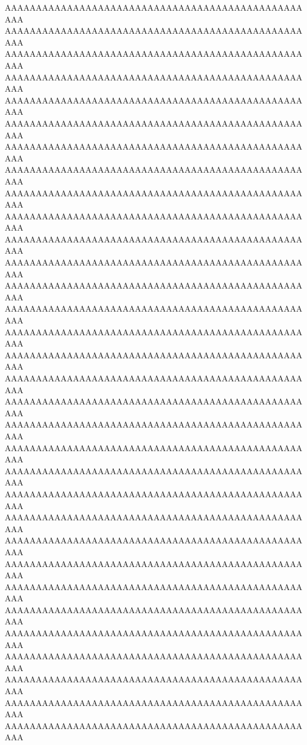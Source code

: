 \documentclass[final,11pt,baselinegrid]{../../uit-thesis}
\begin{document}
AAAAAAAAAAAAAAAAAAAAAAAAAAAAAAAAAAAAAAAAAAAAAAAAAAA\newline
AAAAAAAAAAAAAAAAAAAAAAAAAAAAAAAAAAAAAAAAAAAAAAAAAAA\newline
AAAAAAAAAAAAAAAAAAAAAAAAAAAAAAAAAAAAAAAAAAAAAAAAAAA\newline
AAAAAAAAAAAAAAAAAAAAAAAAAAAAAAAAAAAAAAAAAAAAAAAAAAA\newline
AAAAAAAAAAAAAAAAAAAAAAAAAAAAAAAAAAAAAAAAAAAAAAAAAAA\newline
AAAAAAAAAAAAAAAAAAAAAAAAAAAAAAAAAAAAAAAAAAAAAAAAAAA\newline
AAAAAAAAAAAAAAAAAAAAAAAAAAAAAAAAAAAAAAAAAAAAAAAAAAA\newline
AAAAAAAAAAAAAAAAAAAAAAAAAAAAAAAAAAAAAAAAAAAAAAAAAAA\newline
AAAAAAAAAAAAAAAAAAAAAAAAAAAAAAAAAAAAAAAAAAAAAAAAAAA\newline
AAAAAAAAAAAAAAAAAAAAAAAAAAAAAAAAAAAAAAAAAAAAAAAAAAA\newline
%
AAAAAAAAAAAAAAAAAAAAAAAAAAAAAAAAAAAAAAAAAAAAAAAAAAA\newline
AAAAAAAAAAAAAAAAAAAAAAAAAAAAAAAAAAAAAAAAAAAAAAAAAAA\newline
AAAAAAAAAAAAAAAAAAAAAAAAAAAAAAAAAAAAAAAAAAAAAAAAAAA\newline
AAAAAAAAAAAAAAAAAAAAAAAAAAAAAAAAAAAAAAAAAAAAAAAAAAA\newline
AAAAAAAAAAAAAAAAAAAAAAAAAAAAAAAAAAAAAAAAAAAAAAAAAAA\newline
AAAAAAAAAAAAAAAAAAAAAAAAAAAAAAAAAAAAAAAAAAAAAAAAAAA\newline
AAAAAAAAAAAAAAAAAAAAAAAAAAAAAAAAAAAAAAAAAAAAAAAAAAA\newline
AAAAAAAAAAAAAAAAAAAAAAAAAAAAAAAAAAAAAAAAAAAAAAAAAAA\newline
AAAAAAAAAAAAAAAAAAAAAAAAAAAAAAAAAAAAAAAAAAAAAAAAAAA\newline
AAAAAAAAAAAAAAAAAAAAAAAAAAAAAAAAAAAAAAAAAAAAAAAAAAA\newline
AAAAAAAAAAAAAAAAAAAAAAAAAAAAAAAAAAAAAAAAAAAAAAAAAAA\newline
AAAAAAAAAAAAAAAAAAAAAAAAAAAAAAAAAAAAAAAAAAAAAAAAAAA\newline
AAAAAAAAAAAAAAAAAAAAAAAAAAAAAAAAAAAAAAAAAAAAAAAAAAA\newline
AAAAAAAAAAAAAAAAAAAAAAAAAAAAAAAAAAAAAAAAAAAAAAAAAAA\newline
AAAAAAAAAAAAAAAAAAAAAAAAAAAAAAAAAAAAAAAAAAAAAAAAAAA\newline
AAAAAAAAAAAAAAAAAAAAAAAAAAAAAAAAAAAAAAAAAAAAAAAAAAA\newline
AAAAAAAAAAAAAAAAAAAAAAAAAAAAAAAAAAAAAAAAAAAAAAAAAAA\newline
AAAAAAAAAAAAAAAAAAAAAAAAAAAAAAAAAAAAAAAAAAAAAAAAAAA\newline
AAAAAAAAAAAAAAAAAAAAAAAAAAAAAAAAAAAAAAAAAAAAAAAAAAA\newline
AAAAAAAAAAAAAAAAAAAAAAAAAAAAAAAAAAAAAAAAAAAAAAAAAAA\newline
AAAAAAAAAAAAAAAAAAAAAAAAAAAAAAAAAAAAAAAAAAAAAAAAAAA\newline
AAAAAAAAAAAAAAAAAAAAAAAAAAAAAAAAAAAAAAAAAAAAAAAAAAA\newline
\lipsum[1]
\lipsum[1]
\lipsum[1-7]
\end{document}
